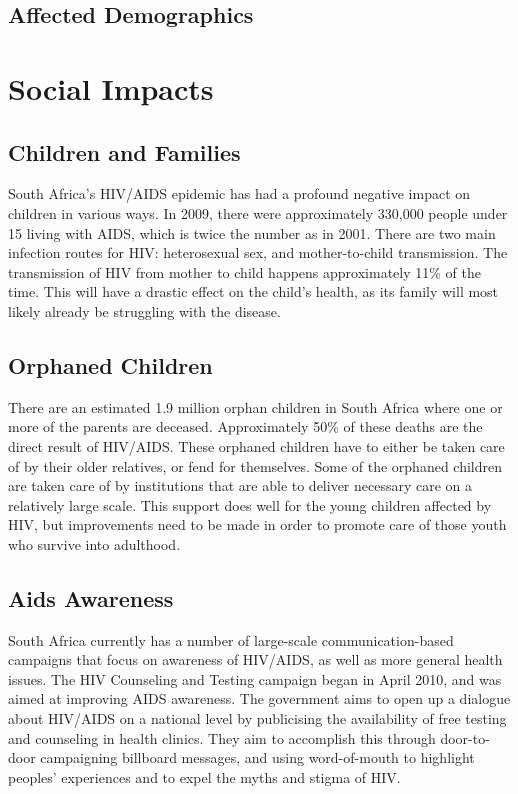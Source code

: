 \documentclass[12pt]{report}
\begin{document}
\subsection{Affected Demographics}

\section{Social Impacts}

\subsection{Children and Families}
South Africa's HIV/AIDS epidemic has had a profound negative impact on children in various ways.  
In 2009, there were approximately 330,000 people under 15 living with AIDS, which is twice the number as in 2001.
There are two main infection routes for HIV: heterosexual sex, and mother-to-child transmission.  The transmission of HIV from mother to child happens approximately 11\% of the time.
This will have a drastic effect on the child's health, as its family will most likely already be struggling with the disease\cite{avert}.

\subsection{Orphaned Children}
There are an estimated 1.9 million orphan children in South Africa where one or more of the parents are deceased.
Approximately 50\% of these deaths are the direct result of HIV/AIDS\cite{avert}.
These orphaned children have to either be taken care of by their older relatives, or fend for themselves.
Some of the orphaned children are taken care of by institutions that are able to deliver necessary care on a relatively large scale.
This support does well for the young children affected by HIV, but improvements need to be made in order to promote care of those youth who survive into adulthood.

\subsection{Aids Awareness}
South Africa currently has a number of large-scale communication-based campaigns that focus on awareness of HIV/AIDS, as well as more general health issues.
The HIV Counseling and Testing campaign began in April 2010, and was aimed at improving AIDS awareness.
The government aims to open up a dialogue about HIV/AIDS on a national level by publicising the availability of free testing and counseling in health clinics.
They aim to accomplish this through door-to-door campaigning billboard messages, and using word-of-mouth to highlight peoples' experiences and to expel the myths and stigma of HIV.
\end{document}
